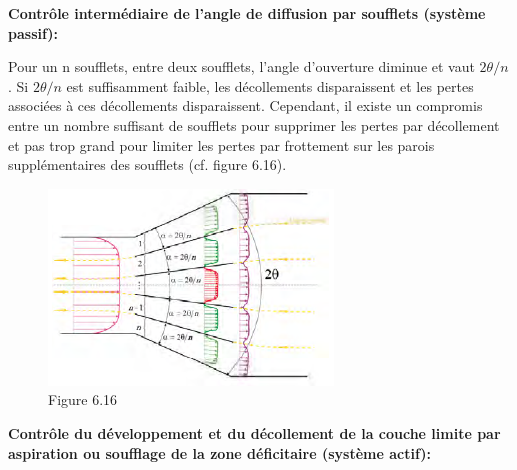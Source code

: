 \textbf{Contrôle intermédiaire de l’angle de diffusion par soufflets (système passif):}

Pour un n soufflets, entre deux soufflets, l’angle d’ouverture diminue et vaut $2 \theta /n$. Si $2 \theta /n$ est suffisamment faible, les décollements disparaissent et les pertes associées à ces décollements disparaissent. Cependant, il existe un compromis entre un nombre suffisant de soufflets pour supprimer les pertes par décollement et pas trop grand pour limiter les pertes par frottement sur les parois supplémentaires des soufflets (cf. figure 6.16).

\begin{figure}[H]
\begin{center}
\includegraphics[scale=0.50]{ch6/77.png}
\caption*{Figure 6.16}
\end{center}
\end{figure}

\textbf{Contrôle du développement et du décollement de la couche limite par aspiration ou soufflage de la zone déficitaire (système actif):}

